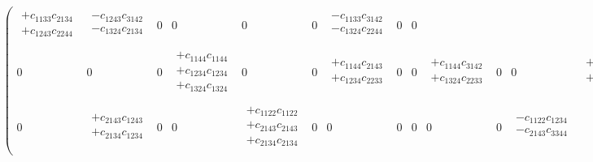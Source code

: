 \begin{eqnarray}
\begin{pmatrix}
\begin{array}{l}
+c_{1133}c_{2134} \\
+c_{1243}c_{2244} \\
\end{array} &
\begin{array}{l}
-c_{1243}c_{3142} \\
-c_{1324}c_{2134} \\
\end{array} &
0 &
0 &
0 &
0 &
\begin{array}{l}
-c_{1133}c_{3142} \\
-c_{1324}c_{2244} \\
\end{array} &
0 &
0 \\
0 &
0 &
0 &
\begin{array}{l}
+c_{1144}c_{1144} \\
+c_{1234}c_{1234} \\
+c_{1324}c_{1324} \\
\end{array} &
0 &
0 &
\begin{array}{l}
+c_{1144}c_{2143} \\
+c_{1234}c_{2233} \\
\end{array} &
0 &
0 &
\begin{array}{l}
+c_{1144}c_{3142} \\
+c_{1324}c_{2233} \\
\end{array} &
0 &
0 &
\begin{array}{l}
+c_{1234}c_{3142} \\
+c_{1324}c_{2143} \\
\end{array} &
0 &
0 &
0 \\
0 &
\begin{array}{l}
+c_{2143}c_{1243} \\
+c_{2134}c_{1234} \\
\end{array} &
0 &
0 &
\begin{array}{l}
+c_{1122}c_{1122} \\
+c_{2143}c_{2143} \\
+c_{2134}c_{2134} \\
\end{array} &
0 &
0 &
0 &
0 &
0 &
0 &
\begin{array}{l}
-c_{1122}c_{1234} \\
-c_{2143}c_{3344} \\
\end{array} &

\end{pmatrix}
\end{eqnarray}
